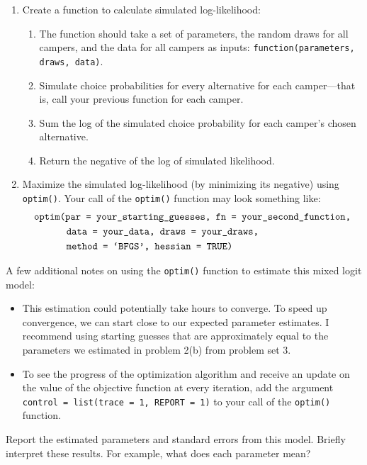 \documentclass[11pt,letterpaper]{article}
\begin{document}
\begin{enumerate}[label=\alph*., leftmargin=*]
\begin{enumerate}[label=\Roman*.]
\begin{enumerate}[label=\roman*.]
		\end{enumerate}
		\item Create a function to calculate simulated log-likelihood:
		\begin{enumerate}[label=\roman*.]
			\item The function should take a set of parameters, the random draws for all campers, and the data for all campers as inputs: \texttt{function(parameters, draws, data)}.
			\item Simulate choice probabilities for every alternative for each camper---that is, call your previous function for each camper.
			\item Sum the log of the simulated choice probability for each camper's chosen alternative.
			\item Return the negative of the log of simulated likelihood.
		\end{enumerate}
		\item Maximize the simulated log-likelihood (by minimizing its negative) using \texttt{optim()}. Your call of the \texttt{optim()} function may look something like:
		\begin{align*}
			&\text{\texttt{optim(par = your\_starting\_guesses, fn = your\_second\_function,}} \\
			& \qquad \quad \; \text{\texttt{data = your\_data, draws = your\_draws,}} \\
			& \qquad \quad \; \text{\texttt{method = `BFGS', hessian = TRUE)}}
		\end{align*}
	\end{enumerate}
	A few additional notes on using the \texttt{optim()} function to estimate this mixed logit model:
	\begin{itemize}
		\item This estimation could potentially take hours to converge. To speed up convergence, we can start close to our expected parameter estimates. I recommend using starting guesses that are approximately equal to the parameters we estimated in problem 2(b) from problem set 3.
		\item To see the progress of the optimization algorithm and receive an update on the value of the objective function at every iteration, add the argument \texttt{control = list(trace = 1, REPORT = 1)} to your call of the \texttt{optim()} function.
	\end{itemize}
	Report the estimated parameters and standard errors from this model. Briefly interpret these results. For example, what does each parameter mean?


\end{enumerate}
\end{document}
